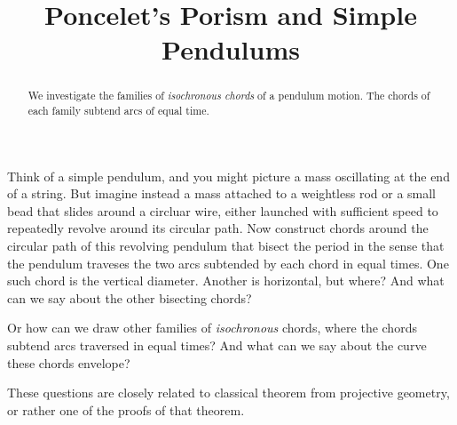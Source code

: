 \documentclass{ximera}
\title{Poncelet's Porism and Simple Pendulums}
\begin{document}
\begin{abstract}
We investigate the families of \emph{isochronous chords} of a pendulum motion. The chords of each family subtend arcs of equal time.
\end{abstract}
\maketitle


Think of a simple pendulum, and you might picture a mass oscillating at the end of a string. But imagine instead a mass attached to a weightless rod or a small bead that slides around a circluar wire, either launched with sufficient speed to repeatedly revolve around its circular path. Now construct chords around the circular path of this revolving pendulum that bisect the period in the sense that the pendulum traveses the two arcs subtended by each chord in equal times. One such chord is the vertical diameter. Another is horizontal, but where? And what can we say about the other bisecting chords?




Or how can we draw other families of \emph{isochronous} chords, where the chords subtend arcs traversed in equal times?  And what can we say about the curve these chords envelope?


These questions are closely related to classical theorem from projective geometry, or rather one of the proofs of that theorem.
\end{document}
